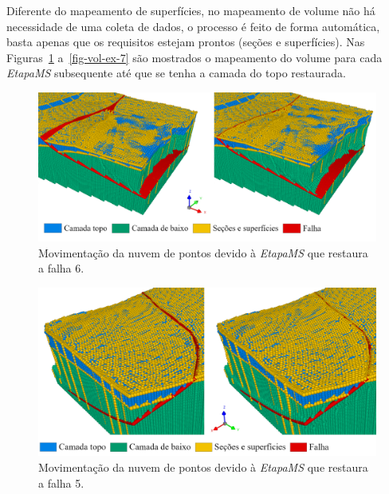 Diferente do mapeamento de superfícies, no mapeamento de volume não há necessidade de uma coleta de dados, o processo é feito de forma automática, basta apenas que os requisitos estejam prontos (seções e superfícies). Nas Figuras~\ref{fig-vol-ex-4} a~\ref{fig-vol-ex-7} são mostrados o mapeamento do volume para cada \emph{EtapaMS} subsequente até que se tenha a camada do topo restaurada.

\begin{figure} [H]
  \begin{center}
    \includegraphics[width=\textwidth]{images/fig-vol-ex-4}
    \caption{Movimentação da nuvem de pontos devido à \emph{EtapaMS} que restaura a falha 6.}\label{fig-vol-ex-4}
  \end{center}
\end{figure}

\begin{figure} [H]
  \begin{center}
    \includegraphics[width=\textwidth]{images/fig-vol-ex-5}
    \caption{Movimentação da nuvem de pontos devido à \emph{EtapaMS} que restaura a falha 5.}\label{fig-vol-ex-5}
  \end{center}
\end{figure}

